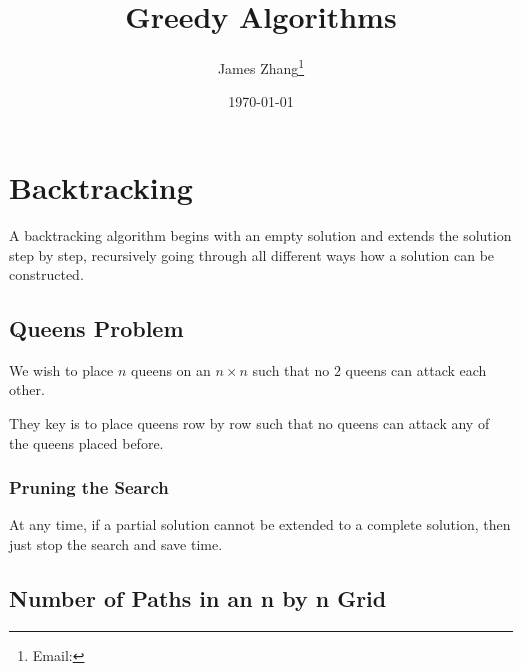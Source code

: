\documentclass[12pt]{scrartcl}
\begin{document}
\title{Greedy Algorithms}
\author{James Zhang\thanks{Email: }}
\date{\today}



\maketitle
\newpage
\tableofcontents
\newpage

\section{Backtracking}

A backtracking algorithm begins with an empty solution and extends 
the solution step by step, recursively going through all different ways 
how a solution can be constructed.

\subsection{Queens Problem}

We wish to place $n$ queens on an $n \times n$ such that no $2$ queens can attack 
each other.

\begin{note}
They key is to place queens row by row such that no queens can attack any of
the queens placed before.
\end{note}

\subsubsection{Pruning the Search}

At any time, if a partial solution cannot be extended to a complete solution, 
then just stop the search and save time. 

\subsection{Number of Paths in an n by n Grid}
\end{document}
